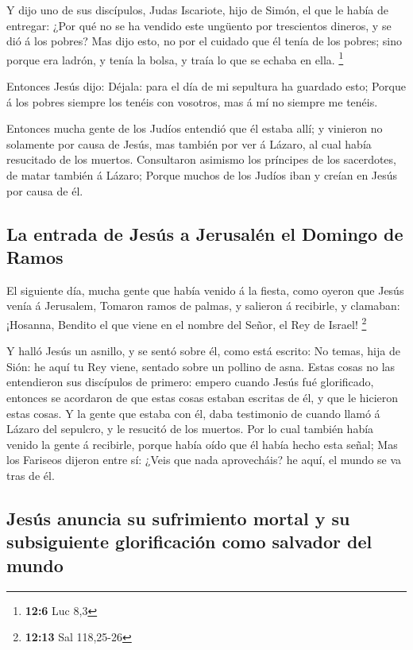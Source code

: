  Y dijo uno de sus discípulos, Judas Iscariote, hijo de
Simón, el que le había de entregar:  ¿Por qué no se ha
vendido este ungüento por trescientos dineros, y se dió á los pobres?
 Mas dijo esto, no por el cuidado que él tenía de los
pobres; sino porque era ladrón, y tenía la bolsa, y traía lo que se
echaba en ella. \footnote{\textbf{12:6} Luc 8,3}

 Entonces Jesús dijo: Déjala: para el día de mi sepultura ha
guardado esto;  Porque á los pobres siempre los tenéis con
vosotros, mas á mí no siempre me tenéis.

 Entonces mucha gente de los Judíos entendió que él estaba
allí; y vinieron no solamente por causa de Jesús, mas también por ver á
Lázaro, al cual había resucitado de los muertos. 
Consultaron asimismo los príncipes de los sacerdotes, de matar también á
Lázaro;  Porque muchos de los Judíos iban y creían en Jesús
por causa de él.

\hypertarget{la-entrada-de-jesuxfas-a-jerusaluxe9n-el-domingo-de-ramos}{%
\subsection{La entrada de Jesús a Jerusalén el Domingo de
Ramos}\label{la-entrada-de-jesuxfas-a-jerusaluxe9n-el-domingo-de-ramos}}

 El siguiente día, mucha gente que había venido á la
fiesta, como oyeron que Jesús venía á Jerusalem,  Tomaron
ramos de palmas, y salieron á recibirle, y clamaban: ¡Hosanna, Bendito
el que viene en el nombre del Señor, el Rey de Israel! \footnote{\textbf{12:13}
  Sal 118,25-26}

 Y halló Jesús un asnillo, y se sentó sobre él, como está
escrito:  No temas, hija de Sión: he aquí tu Rey viene,
sentado sobre un pollino de asna.  Estas cosas no las
entendieron sus discípulos de primero: empero cuando Jesús fué
glorificado, entonces se acordaron de que estas cosas estaban escritas
de él, y que le hicieron estas cosas.  Y la gente que
estaba con él, daba testimonio de cuando llamó á Lázaro del sepulcro, y
le resucitó de los muertos.  Por lo cual también había
venido la gente á recibirle, porque había oído que él había hecho esta
señal;  Mas los Fariseos dijeron entre sí: ¿Veis que nada
aprovecháis? he aquí, el mundo se va tras de él.

\hypertarget{jesuxfas-anuncia-su-sufrimiento-mortal-y-su-subsiguiente-glorificaciuxf3n-como-salvador-del-mundo}{%
\subsection{Jesús anuncia su sufrimiento mortal y su subsiguiente
glorificación como salvador del
mundo}\label{jesuxfas-anuncia-su-sufrimiento-mortal-y-su-subsiguiente-glorificaciuxf3n-como-salvador-del-mundo}}

